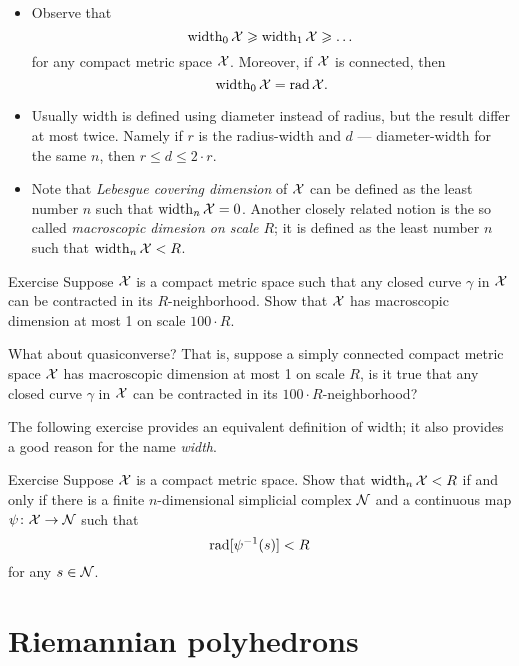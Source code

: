 \begin{itemize}
\item Observe that 
\[\operatorname{\rm width}\nolimits_0\mathcal{X}\geqslant\operatorname{\rm width}\nolimits_1\mathcal{X}\geqslant\dots\]
for any compact metric space $\mathcal{X}$.
Moreover, if $\mathcal{X}$ is connected, then 
\[\operatorname{\rm width}\nolimits_0\mathcal{X}=\mathop{\rm rad}\nolimits\mathcal{X}.\]
\item 
Usually width is defined using diameter instead of radius, but the result differ at most twice.
Namely if $r$ is the radius-width and $d$ --- diameter-width for the same $n$, then 
$r\le d\le 2\cdot r$.

\item Note that \emph{Lebesgue covering dimension} of $\mathcal{X}$ can be defined as the least number $n$ such that $\operatorname{\rm width}\nolimits_n\mathcal{X}=0$.
Another closely related notion is the so called \emph{macroscopic dimesion on scale $R$};
it is defined as the  least number $n$ such that $\operatorname{\rm width}\nolimits_n\mathcal{X}<R$.
\end{itemize}

\begin{thm}{Exercise}\label{ex:macrodimension}
Suppose $\mathcal{X}$ is a compact metric space such that any closed curve $\gamma$ in $\mathcal{X}$ can be contracted in its $R$-neighborhood.
Show that $\mathcal{X}$ has macroscopic dimension at most 1 on scale $100\cdot R$.

What about quasiconverse? That is, suppose a simply connected compact metric space $\mathcal{X}$ has macroscopic dimension at most 1 on scale $R$, is it true that any closed curve $\gamma$ in $\mathcal{X}$ can be contracted in its $100\cdot R$-neighborhood?
\end{thm}


The following exercise provides an equivalent definition of width;
it also provides a good reason for the name \emph{width}.

\begin{thm}{Exercise}\label{ex:width=suprad(inv)}
Suppose $\mathcal{X}$ is a compact metric space.
Show that $\operatorname{\rm width}\nolimits_n\mathcal{X}<R$ if and only if there is a finite $n$-dimensional simplicial complex $\mathcal{N}$ and a continuous map $\psi\colon\mathcal{X}\to \mathcal{N}$
such that 
\[\mathop{\rm rad}\nolimits[\psi^{-1}(s)]<R\]
for any $s\in \mathcal{N}$.
\end{thm}

\section{Riemannian polyhedrons}

